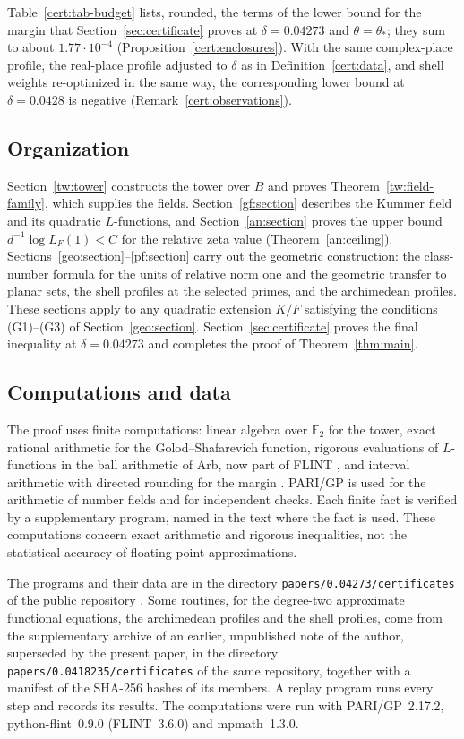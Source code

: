 \documentclass[11pt]{amsart}
\numberwithin{equation}{section}
\theoremstyle{definition}
\theoremstyle{remark}
\newcommand{\Ftwo}{\mathbb F_2}
\newcommand{\deltastar}{0.04273}
\begin{document}
Table~\ref{cert:tab-budget} lists, rounded, the terms of the lower bound
for the margin that Section~\ref{sec:certificate} proves at
$\delta=\deltastar$ and $\theta=\theta_*$; they sum to about $1.77\cdot10^{-4}$
(Proposition~\ref{cert:enclosures}). With the same complex-place
profile, the real-place profile adjusted to $\delta$ as in
Definition~\ref{cert:data}, and shell weights re-optimized in the same
way, the corresponding lower bound at $\delta=0.0428$ is negative
(Remark~\ref{cert:observations}).

\subsection{Organization}\label{intro:organization}
Section~\ref{tw:tower} constructs the tower over $B$ and proves
Theorem~\ref{tw:field-family}, which supplies the fields.
Section~\ref{gf:section} describes the Kummer field and its quadratic
$L$-functions, and Section~\ref{an:section} proves the upper bound
$d^{-1}\log L_F(1)<C$ for the relative zeta value
(Theorem~\ref{an:ceiling}). Sections~\ref{geo:section}--\ref{pf:section}
carry out the geometric construction: the class-number formula for the
units of relative norm one and the geometric transfer to planar sets,
the shell profiles at the selected primes, and the archimedean profiles.
These sections apply to any quadratic extension $K/F$ satisfying the
conditions (G1)--(G3) of Section~\ref{geo:section}. Section~\ref{sec:certificate} proves the final inequality
at $\delta=\deltastar$ and completes the proof of
Theorem~\ref{thm:main}.

\subsection{Computations and data}\label{intro:code}
The proof uses finite computations: linear algebra over $\Ftwo$ for the
tower, exact rational arithmetic for the Golod--Shafarevich function,
rigorous evaluations of $L$-functions in the ball arithmetic of Arb,
now part of FLINT \cite{Johansson2017,FLINT}, and interval arithmetic
with directed rounding for the margin \cite{Mpmath}. PARI/GP \cite{PARI} is
used for the arithmetic of number fields and for independent checks.
Each finite fact is verified by a supplementary program, named in the
text where the fact is used. These computations concern exact
arithmetic and rigorous inequalities, not the statistical accuracy of
floating-point approximations.

The programs and their data are in the directory
\texttt{papers/0.04273/certificates} of the public repository
\cite{NaslundCode2026}. Some routines, for the degree-two approximate
functional equations, the archimedean profiles and the shell profiles,
come from the supplementary archive of an earlier,
unpublished note of the author, superseded by the present paper, in the
directory
\texttt{papers/0.0418235/certificates} of the same repository, together
with a manifest of the SHA-256 hashes of its members. A replay program
runs every step and records its results. The computations were run with
PARI/GP~2.17.2, python-flint~0.9.0 (FLINT~3.6.0) and mpmath~1.3.0.
\end{document}
